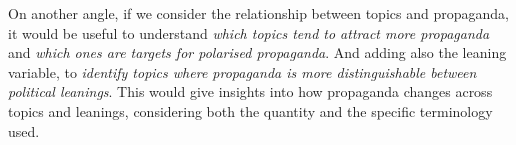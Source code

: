 On another angle, if we consider the relationship between topics and propaganda, it would be useful to understand \emph{which topics tend to attract more propaganda} and \emph{which ones are targets for polarised propaganda}. And adding also the leaning variable, to \emph{identify topics where propaganda is more distinguishable between political leanings}. 
This would give insights into how propaganda changes across topics and leanings, considering both the quantity and the specific terminology used.










